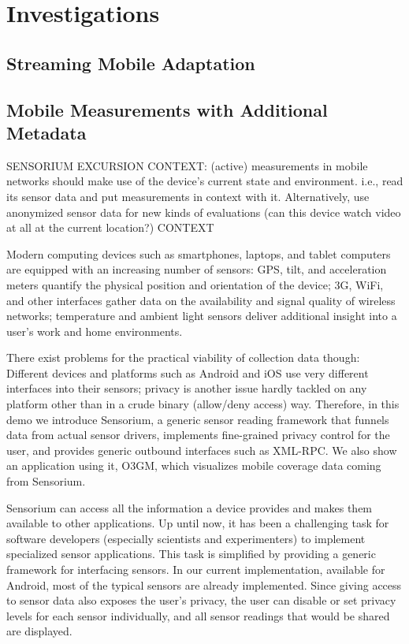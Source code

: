 \section{Investigations}


\subsection{Streaming Mobile Adaptation}



\subsection{Mobile Measurements with Additional Metadata}

SENSORIUM EXCURSION
CONTEXT: (active) measurements in mobile networks should make use of the device's current state and environment. i.e., read its sensor data and put measurements in context with it. Alternatively, use anonymized sensor data for new kinds of evaluations (can this device watch video at all at the current location?)
CONTEXT

Modern computing devices such as smartphones, laptops, and tablet computers are equipped with an increasing number of sensors: GPS, tilt, and acceleration meters quantify the physical position and orientation of the device; 3G, WiFi, and other  interfaces gather data on the availability and signal quality of wireless networks; temperature and ambient light sensors deliver additional insight into a user's work and home environments.

There exist problems for the practical viability of collection data though: Different devices and platforms such as Android and iOS use very different interfaces into their sensors; privacy is another issue hardly tackled on any platform other than in a crude binary (allow/deny access) way. Therefore, in this demo we introduce Sensorium, a generic sensor reading framework that funnels data from actual sensor drivers, implements fine-grained privacy control for the user, and provides generic outbound interfaces such as XML-RPC. We also show an application using it, O3GM, which visualizes mobile coverage data coming from Sensorium.

Sensorium can access all the information a device provides and makes them available to other applications. Up until now, it has been a challenging task for software developers (especially scientists and experimenters) to implement specialized sensor applications. This task is simplified by providing a generic framework for interfacing sensors. In our current implementation, available for Android, most of the typical sensors are already implemented. Since giving access to sensor data also exposes the user's privacy, the user can disable or set privacy levels for each sensor individually, and all sensor readings that would be shared are displayed. %
\\

